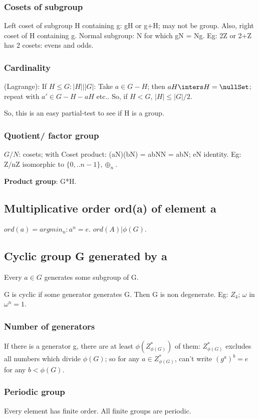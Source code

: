\documentclass[oneside, article]{memoir}
\begin{document}
\subsubsection{Cosets of subgroup}
Left coset of subgroup H containing g: gH or g+H; may not be group. Also, right coset of H containing g. Normal subgroup: N for which gN = Ng. Eg: 2Z or 2+Z has 2 cosets: evens and odds.

\subsubsection{Cardinality}
(Lagrange): If $H \leq G: |H| | |G|$: Take $a \in G-H$; then $aH \inters H = \nullSet$; repeat with $a' \in G-H-aH$ etc.. So, if $H < G$, $|H| \leq |G|/2$.

So, this is an easy partial-test to see if H is a group.

\subsubsection{Quotient/ factor group}
$G/N$: cosets; with Coset product: (aN)(bN) = abNN = abN; eN identity. Eg: Z/nZ isomorphic to $\{0, .. n-1\}, \oplus_n$.

\textbf{Product group}: G*H.

\subsection{Multiplicative order ord(a) of element a}
$ord(a) = argmin_{n}: a^{n}=e$. $ord(A) | \phi(G)$.

\subsection{Cyclic group G generated by a}
Every $a \in G$ generates some subgroup of G.

G is cyclic if some generator generates G. Then G is non degenerate. Eg: $Z_{4}$; $\omega$ in $\omega^{n}=1$.

\subsubsection{Number of generators}
If there is a generator g, there are at least $\phi(Z_{\phi(G)}^{*})$ of them: $Z_{\phi(G)}^{*}$ excludes all numbers which divide $\phi(G)$; so for any $a \in Z_{\phi(G)}^{*}$, can't write $(g^{a})^{b} = e$ for any $b < \phi(G)$.

\subsubsection{Periodic group}
Every element has finite order. All finite groups are periodic.
\end{document}
